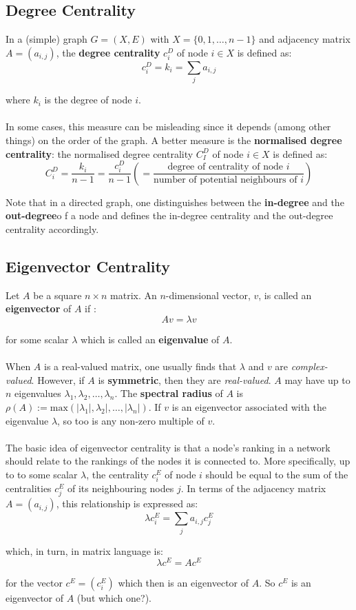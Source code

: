 \documentclass[a4paper,11pt]{article}
\begin{document}
\subsection{Degree Centrality}
In a (simple) graph $G=(X,E)$ with $X=\{ 0, 1, \dots, n-1 \}$ and adjacency matrix $A=(a_{i,j})$, the \textbf{degree centrality} $c_i^D$ of node $i \in X$ is defined as:
\[
    c_i^D = k_i = \sum_j a_{i,j}
\]

where $k_i$ is the degree of node $i$.
\\\\
In some cases, this measure can be misleading since it depends (among other things) on the order of the graph.
A better measure is the \textbf{normalised degree centrality}: the normalised degree centrality $C_I^D$ of node $i \in X$ is defined as:
\[
    C_i^D = \frac{k_i}{n-1} = \frac{c_i^D}{n-1} \left( = \frac{\text{degree of centrality of node } i}{\text{number of potential neighbours of } i} \right)
\]

Note that in a directed graph, one distinguishes between the \textbf{in-degree} and the \textbf{out-degree}o f a node and defines the in-degree centrality and the out-degree centrality accordingly.

\subsection{Eigenvector Centrality}
Let $A$ be a square $n \times n$ matrix.
An $n$-dimensional vector, $v$, is called an \textbf{eigenvector} of $A$ if :
\[
    Av = \lambda v
\]

for some scalar $\lambda$ which is called an \textbf{eigenvalue} of $A$.
\\\\
When $A$ is a real-valued matrix, one usually finds that $\lambda$ and $v$ are \textit{complex-valued}.
However, if $A$ is \textbf{symmetric}, then they are \textit{real-valued}.
$A$ may have up to $n$ eigenvalues $\lambda_1, \lambda_2, \dots, \lambda_n$.
The \textbf{spectral radius} of $A$ is $\rho(A) := \text{max}(|\lambda_1|, \lambda_2|, \dots, |\lambda_n|)$.
If $v$ is an eigenvector associated with the eigenvalue $\lambda$, so too is any non-zero multiple of $v$.
\\\\
The basic idea of eigenvector centrality is that a node's ranking in a network should relate to the rankings of the nodes it is connected to.
More specifically,  up to to some scalar $\lambda$, the centrality $c_i^E$ of node $i$ should be equal to the sum of the centralities $c_j^E$ of its neighbouring nodes $j$.
In terms of the adjacency matrix $A = (a_{i,j})$, this relationship is expressed as:
\[
    \lambda c_i^E = \sum_j a_{i,j} c_j^E
\]

which, in turn, in matrix language is:
\[
    \lambda c^E = Ac^E
\]

for the vector $c^E = (c_i^E)$ which then is an eigenvector of $A$.
So $c^E$ is an eigenvector of $A$ (but which one?).
\end{document}

